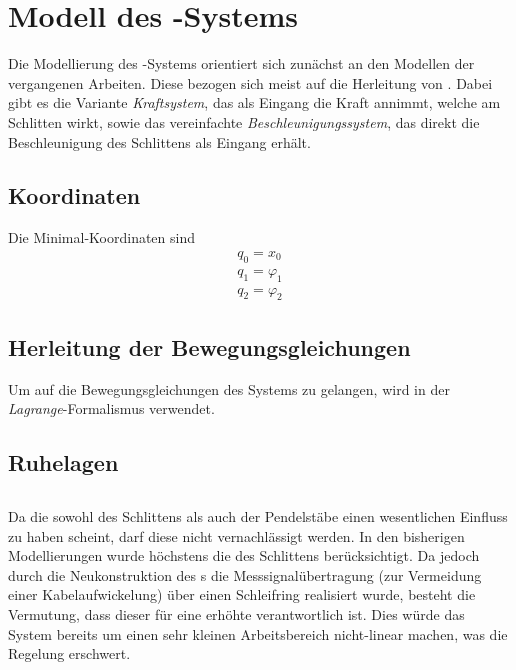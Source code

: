 \section{Modell des \spd-Systems}

Die Modellierung des \spd-Systems orientiert sich zunächst an den Modellen der vergangenen Arbeiten. Diese bezogen sich meist auf die Herleitung von \cite{modpen}. Dabei gibt es die Variante \emph{Kraftsystem}, das als Eingang die Kraft annimmt, welche am Schlitten wirkt, sowie das vereinfachte \emph{Beschleunigungssystem}, das direkt die Beschleunigung des Schlittens als Eingang erhält.

\subsection{Koordinaten}


Die Minimal-Koordinaten sind 
\begin{align*}
	q_0 = x_0  \\
	q_1 = \varphi_1  \\
	q_2 = \varphi_2
\end{align*}

\subsection{Herleitung der Bewegungsgleichungen}

Um auf die Bewegungsgleichungen des Systems zu gelangen, wird in \cite{modpen} der \emph{Lagrange}-Formalismus verwendet.

\subsection{Ruhelagen}



\subsection{\crb}

Da die \crb sowohl des Schlittens als auch der Pendelstäbe einen wesentlichen Einfluss zu haben scheint, darf diese nicht vernachlässigt werden. In den bisherigen Modellierungen wurde höchstens die \crb des Schlittens berücksichtigt. Da jedoch durch die Neukonstruktion des \dpd s die Messsignalübertragung (zur Vermeidung einer Kabelaufwickelung) über einen Schleifring realisiert wurde, besteht die Vermutung, dass dieser für eine erhöhte \crb verantwortlich ist. Dies würde das System bereits um einen sehr kleinen Arbeitsbereich nicht-linear machen, was die Regelung erschwert.

